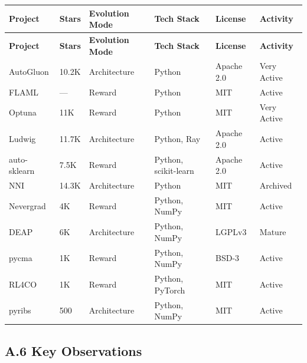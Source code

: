 \begin{longtable}{p{28mm}p{12mm}p{24mm}p{18mm}p{14mm}p{14mm}}
\toprule
\textbf{Project} & \textbf{Stars} & \textbf{Evolution Mode} & \textbf{Tech Stack} & \textbf{License} & \textbf{Activity} \\
\midrule
\endfirsthead
\toprule
\textbf{Project} & \textbf{Stars} & \textbf{Evolution Mode} & \textbf{Tech Stack} & \textbf{License} & \textbf{Activity} \\
\midrule
\endhead

AutoGluon & 10.2K & Architecture & Python & Apache 2.0 & Very Active \\
FLAML & --- & Reward & Python & MIT & Active \\
Optuna & 11K & Reward & Python & MIT & Very Active \\
Ludwig & 11.7K & Architecture & Python, Ray & Apache 2.0 & Active \\
auto-sklearn & 7.5K & Reward & Python, scikit-learn & Apache 2.0 & Active \\
NNI & 14.3K & Architecture & Python & MIT & Archived \\
Nevergrad & 4K & Reward & Python, NumPy & MIT & Active \\
DEAP & 6K & Architecture & Python, NumPy & LGPLv3 & Mature \\
pycma & 1K & Reward & Python, NumPy & BSD-3 & Active \\
RL4CO & 1K & Reward & Python, PyTorch & MIT & Active \\
pyribs & 500 & Architecture & Python, NumPy & MIT & Active \\
\bottomrule
\end{longtable}

\subsection*{A.6 Key Observations}

